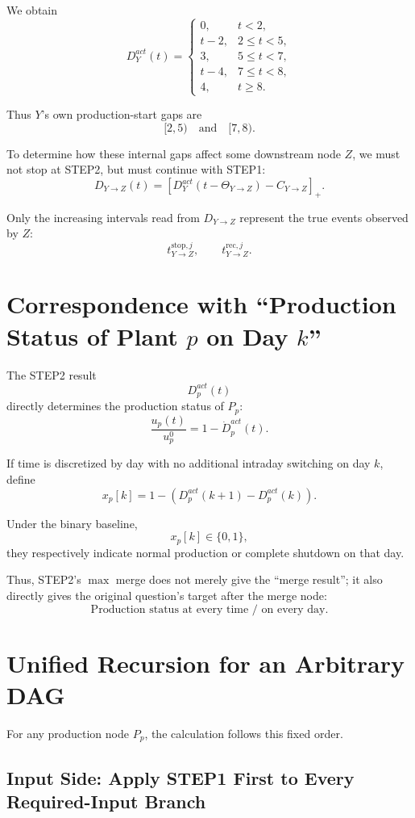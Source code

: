 \documentclass[11pt]{article}
\begin{document}
We obtain
\[
D_Y^{act}(t)
=
\begin{cases}
0, & t<2,\\
t-2, & 2\le t<5,\\
3, & 5\le t<7,\\
t-4, & 7\le t<8,\\
4, & t\ge8.
\end{cases}
\]

Thus \(Y\)'s own production-start gaps are
\[
\boxed{
[2,5)
\quad\text{and}\quad
[7,8).
}
\]

To determine how these internal gaps affect some downstream node \(Z\),
we must not stop at STEP2, but must continue with STEP1:
\[
\boxed{
D_{Y\to Z}(t)
=
\left[
D_Y^{act}(t-\Theta_{Y\to Z})
-C_{Y\to Z}
\right]_+.
}
\tag{26}
\]

Only the increasing intervals read from \(D_{Y\to Z}\)
represent the true events observed by \(Z\):
\[
t_{Y\to Z}^{\mathrm{stop},j},
\qquad
t_{Y\to Z}^{\mathrm{rec},j}.
\]

\section{Correspondence with ``Production Status of Plant \(p\) on Day \(k\)''}

The STEP2 result
\[
D_p^{act}(t)
\]
directly determines the production status of \(P_p\):
\[
\boxed{
\frac{u_p(t)}{u_p^0}
=
1-\dot D_p^{act}(t).
}
\tag{27}
\]

If time is discretized by day with no additional intraday switching on day \(k\),
define
\[
\boxed{
x_p[k]
=
1-
\left(
D_p^{act}(k+1)-D_p^{act}(k)
\right).
}
\tag{28}
\]

Under the binary baseline,
\[
x_p[k]\in\{0,1\},
\]
they respectively indicate normal production or complete shutdown on that day.

Thus, STEP2's \(\max\) merge
does not merely give the ``merge result'';
it also directly gives the original question's target after the merge node:
\[
\boxed{\text{Production status at every time / on every day}.}
\]

\section{Unified Recursion for an Arbitrary DAG}

For any production node \(P_p\), the calculation follows this fixed order.

\subsection*{Input Side: Apply STEP1 First to Every Required-Input Branch}
\end{document}
